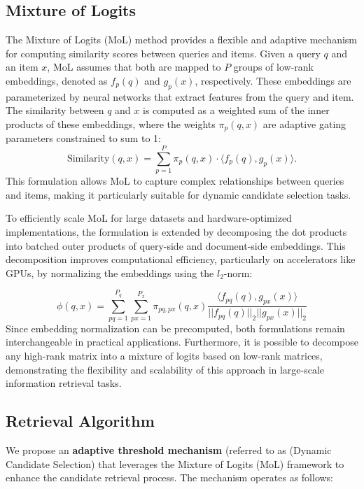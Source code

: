 \documentclass[Afour,sageh,times]{sagej}
\begin{document}
\subsection{Mixture of Logits} 
The Mixture of Logits (MoL) \cite{zhai2023revisiting,ding2024efficient} method provides a flexible and adaptive mechanism for computing similarity scores between queries and items. Given a query \( q \) and an item \( x \), MoL assumes that both are mapped to \( P \) groups of low-rank embeddings, denoted as \( f_p(q) \) and \( g_p(x) \), respectively. These embeddings are parameterized by neural networks that extract features from the query and item. The similarity between \( q \) and \( x \) is computed as a weighted sum of the inner products of these embeddings, where the weights \( \pi_p(q,x)\) \cite{zhai2023revisiting,ding2024efficient} are adaptive gating parameters constrained to sum to 1:
\begin{equation}
\text{Similarity}(q, x) = \sum_{p=1}^P \pi_p(q, x) \cdot \langle f_p(q), g_p(x) \rangle.
\end{equation}
This formulation allows MoL to capture complex relationships between queries and items, making it particularly suitable for dynamic candidate selection tasks.

To efficiently scale MoL for large datasets and hardware-optimized implementations, the formulation is extended by decomposing the dot products into batched outer products of query-side and document-side embeddings. This decomposition improves computational efficiency, particularly on accelerators like GPUs, by normalizing the embeddings using the \( l_2 \)-norm: \cite{zhai2023revisiting}

\begin{equation}
\phi(q,x) = \sum_{pq=1}^{P_q} \sum_{px=1}^{P_x} \pi_{pq,px}(q,x) \frac{\langle f_{pq}(q), g_{px}(x) \rangle}{|| f_{pq}(q) ||_2 || g_{px}(x) ||_2}
\end{equation}
Since embedding normalization can be precomputed, both formulations remain interchangeable in practical applications. Furthermore, it is possible to decompose any high-rank matrix into a mixture of logits based on low-rank matrices, demonstrating the flexibility and scalability of this approach in large-scale information retrieval tasks. 

\subsection{Retrieval Algorithm}
We propose an \textbf{adaptive threshold mechanism} (referred to as (Dynamic Candidate Selection) that leverages the Mixture of Logits (MoL) framework to enhance the candidate retrieval process. The mechanism operates as follows:
\end{document}

